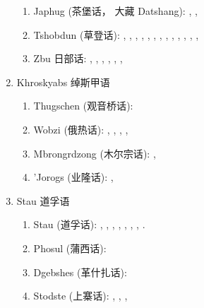 \documentclass[oldfontcommands,oneside,a4paper,11pt]{article}
\newcommand{\zh}[1]{{\cn #1}}
\newcommand{\langue}[2]{#1}
\begin{document}
\begin{enumerate}
\begin{enumerate}
\item Japhug (\zh{茶堡话， 大藏} Datshang): \citet{linxr93jiarong}, \citet{linluo03}, \citet{lin11direction}
\item Tshobdun (\zh{草登话}):  \citet{jackson94caodeng}, \citet{jackson98morphology}, \citet{jackson00sidaba}, \citet{jackson02rentongdengdi}, \citet{jackson03caodeng}, \citet{jackson04zhuangmaoci}, \citet{jackson05yingao},  \citet{jackson06paisheng}, \citet{jackson06guanxiju}, \citet{jackson07irrealis}, \citet{jacksonlin07}, \citet{sun12complementation}, \citet{sun14generic}, \citet{jackson14morpho}
\item Zbu \zh{日部话}: \citet{linxr93jiarong}, \citet{jackson00puxi}, \citet{jackson00sidaba}, \citet{jackson04showu}, \citet{jacques08}, \citet{gongxun14agreement}, 
\end{enumerate}
\item \langue{Khroskyabs \zh{绰斯甲语}}{Khroskyabs \zh{绰斯甲语}}
\begin{enumerate}
\item Thugschen (\zh{观音桥话}): \citet{huangbf07lavrung}
\item Wobzi (\zh{俄热话}): \citet{linxr93jiarong}, \citet{lai13fuyin}, \citet{lai13affixale}, \citet{lai14caus}, \citet{lai14person}
\item Mbrongrdzong (\zh{木尔宗话}): \citet{jackson00sidaba}, \citet{jackson05yingao}
\item 'Jorogs (\zh{业隆话}):  \citet{yin07yelong}, 
\end{enumerate}
\item \langue{Stau \zh{道孚语}}{Stau \zh{道孚语}}
\begin{enumerate} 
\item Stau (\zh{道孚话}): \citet{hodgson57sifan}, \citet{wang70stau}, \citet{sun83liujiang}, \citet{huangbf91daofu},  \citet{huangbf91daofu}, \citet{sun13gexi}, \citet{antonov14rtau}, \citet{jacques14rtau}.
\item Phosul (\zh{蒲西话}): \citet{jackson00puxi}
\item Dgebshes (\zh{革什扎话}): \citet{duoerji98geshizha}
\item Stodste (\zh{上寨话}): \citet{jackson00sidaba}, \citet{qu07shangzhai}, \citet{jackson07shangzhai},
\end{enumerate}
\end{enumerate}
\end{document}
